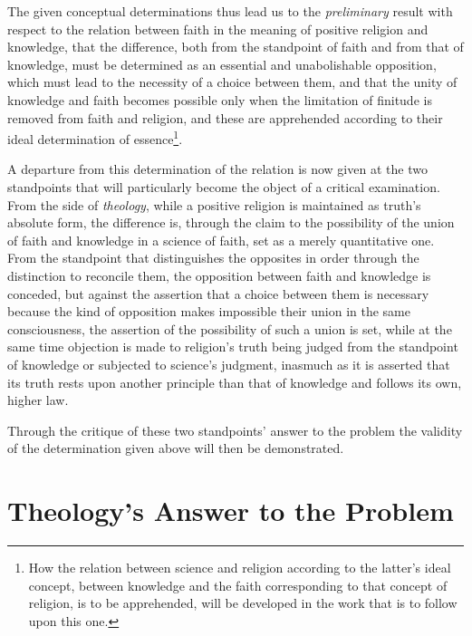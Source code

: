 \documentclass[12pt,a4paper]{book}
\begin{document}
The given conceptual determinations thus lead us to the \emph{preliminary} result with
respect to the relation between faith in the meaning of positive religion and
knowledge, that the difference, both from the standpoint of faith and from that of
knowledge, must be determined as an essential and unabolishable opposition, which
must lead to the necessity of a choice between them, and that the unity of
knowledge and faith becomes possible only when the limitation of finitude is
removed from faith and religion, and these are apprehended according to their
ideal determination of essence\footnote{How the relation between science and
religion according to the latter's ideal concept, between knowledge and the faith
corresponding to that concept of religion, is to be apprehended, will be developed
in the work that is to follow upon this one.}.

A departure from this determination of the relation is now given at the two
standpoints that will particularly become the object of a critical examination.
From the side of \emph{theology}, while a positive religion is maintained as truth's
absolute form, the difference is, through the claim to the possibility of the
union of faith and knowledge in a science of faith, set as a merely quantitative
one. From the standpoint that distinguishes the opposites in order through the
distinction to reconcile them, the opposition between faith and knowledge is
conceded, but against the assertion that a choice between them is necessary because
the kind of opposition makes impossible their union in the same consciousness, the
assertion of the possibility of such a union is set, while at the same time
objection is made to religion's truth being judged from the standpoint of knowledge
or subjected to science's judgment, inasmuch as it is asserted that its truth rests
upon another principle than that of knowledge and follows its own, higher law.

Through the critique of these two standpoints' answer to the problem the validity
of the determination given above will then be demonstrated.


\chapter{Theology's Answer to the Problem}
\label{ch:theology}
\end{document}
